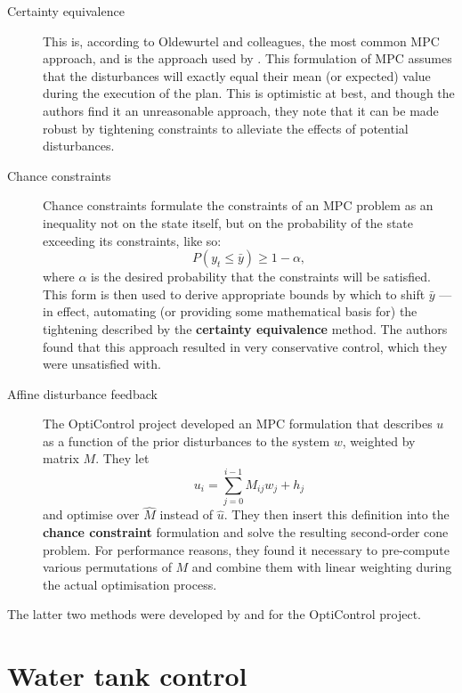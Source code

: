 \begin{description}
   \item[Certainty equivalence]
      This is, according to Oldewurtel and colleagues, the most common MPC approach, and is the approach used by .
      This formulation of MPC assumes that the disturbances will exactly equal their mean (or expected) value during the execution of the plan.
      This is optimistic at best, and though the authors find it an unreasonable approach, they note that it can be made robust by tightening constraints to alleviate the effects of potential disturbances.

   \item[Chance constraints]
      Chance constraints formulate the constraints of an MPC problem as an inequality not on the state itself, but on the probability of the state exceeding its constraints, like so:
      $$ P(y_t \leq \bar{y}) \geq 1 - \alpha, $$
      where $\alpha$ is the desired probability that the constraints will be satisfied.
      This form is then used to derive appropriate bounds by which to shift $\bar{y}$ --- in effect, automating (or providing some mathematical basis for) the tightening described by the {\bf certainty equivalence} method.
      The authors found that this approach resulted in very conservative control, which they were unsatisfied with.

   \item[Affine disturbance feedback]
      The OptiControl project developed an MPC formulation that describes $u$ as a function of the prior disturbances to the system $w$, weighted by matrix $M$.
      They let
      $$ u_i = \sum _{j=0} ^{i-1} M_{ij} w_j + h_j $$
      and optimise over $\hat{M}$ instead of $\hat{u}$.
      They then insert this definition into the {\bf chance constraint} formulation and solve the resulting second-order cone problem.
      For performance reasons, they found it necessary to pre-compute various permutations of $M$ and combine them with linear weighting during the actual optimisation process.
\end{description}

The latter two methods were developed by and for the OptiControl project.

\section{Water tank control}



